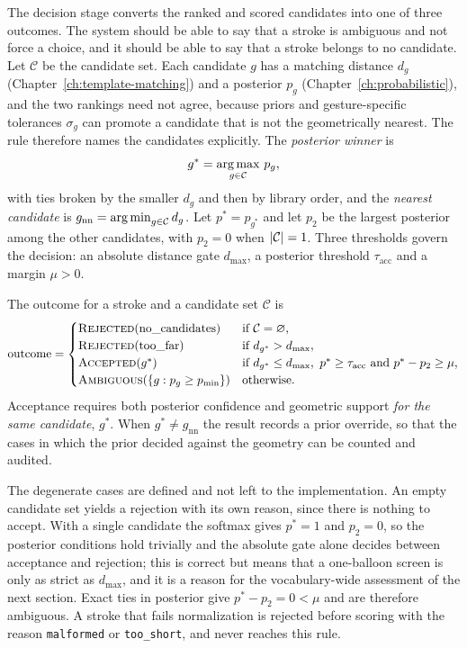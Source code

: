 The decision stage converts the ranked and scored candidates into one of three outcomes. The system should be able to say that a stroke is ambiguous and not force a choice, and it should be able to say that a stroke belongs to no candidate. Let $\mathcal C$ be the candidate set. Each candidate $g$ has a matching distance $d_g$ (Chapter~\ref{ch:template-matching}) and a posterior $p_g$ (Chapter~\ref{ch:probabilistic}), and the two rankings need not agree, because priors and gesture-specific tolerances $\sigma_g$ can promote a candidate that is not the geometrically nearest. The rule therefore names the candidates explicitly. The \emph{posterior winner} is
\[
g^{\ast}=\operatorname*{arg\,max}_{g\in\mathcal C}\,p_g,
\]
with ties broken by the smaller $d_g$ and then by library order, and the \emph{nearest candidate} is $g_{\mathrm{nn}}=\operatorname*{arg\,min}_{g\in\mathcal C}d_g$. Let $p^{\ast}=p_{g^\ast}$ and let $p_2$ be the largest posterior among the other candidates, with $p_2=0$ when $\lvert \mathcal C\rvert=1$. Three thresholds govern the decision: an absolute distance gate $d_{\max}$, a posterior threshold $\tau_{\mathrm{acc}}$ and a margin $\mu>0$.

\begin{definition}\label{def:decision}
The outcome for a stroke and a candidate set $\mathcal C$ is
\[
\text{outcome}=\begin{cases}
\textsc{Rejected}(\text{no\_candidates}) & \text{if } \mathcal C=\varnothing,\\
\textsc{Rejected}(\text{too\_far}) & \text{if } d_{g^\ast}>d_{\max},\\
\textsc{Accepted}(g^{\ast}) & \text{if } d_{g^\ast}\le d_{\max},\ p^{\ast}\ge\tau_{\mathrm{acc}}\text{ and }p^{\ast}-p_2\ge\mu,\\
\textsc{Ambiguous}(\{g:p_g\ge p_{\min}\}) & \text{otherwise.}
\end{cases}
\]
Acceptance requires both posterior confidence and geometric support \emph{for the same candidate}, $g^{\ast}$. When $g^{\ast}\ne g_{\mathrm{nn}}$ the result records a prior override, so that the cases in which the prior decided against the geometry can be counted and audited.
\end{definition}

The degenerate cases are defined and not left to the implementation. An empty candidate set yields a rejection with its own reason, since there is nothing to accept. With a single candidate the softmax gives $p^{\ast}=1$ and $p_2=0$, so the posterior conditions hold trivially and the absolute gate alone decides between acceptance and rejection; this is correct but means that a one-balloon screen is only as strict as $d_{\max}$, and it is a reason for the vocabulary-wide assessment of the next section. Exact ties in posterior give $p^{\ast}-p_2=0<\mu$ and are therefore ambiguous. A stroke that fails normalization is rejected before scoring with the reason \texttt{malformed} or \texttt{too\_short}, and never reaches this rule.

